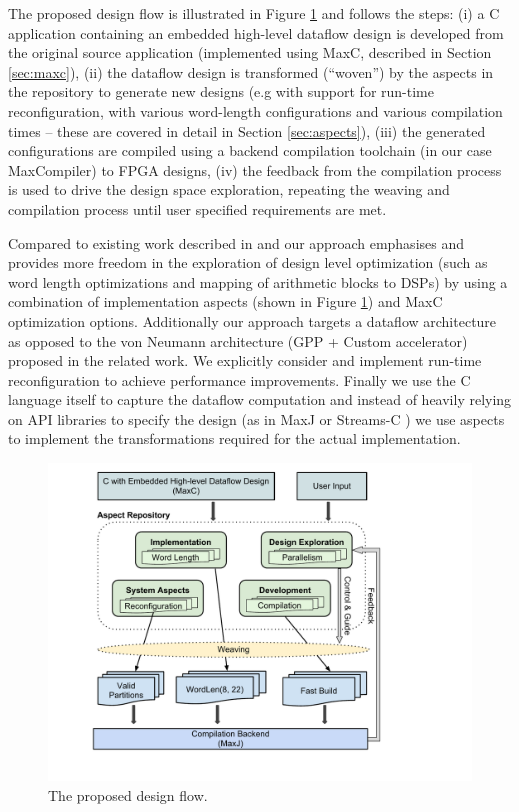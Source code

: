 The proposed design flow is illustrated in Figure
\ref{fig:design-flow} and follows the steps: (i) a C application
containing an embedded high-level dataflow design is developed from
the original source application (implemented using MaxC, described in
Section \ref{sec:maxc}), (ii) the dataflow design is transformed
(``woven'') by the aspects in the repository to generate new designs
(e.g with support for run-time reconfiguration, with various
word-length configurations and various compilation times -- these are
covered in detail in Section \ref{sec:aspects}), (iii) the generated
configurations are compiled using a backend compilation toolchain (in
our case MaxCompiler) to FPGA designs, (iv) the feedback from the
compilation process is used to drive the design space exploration,
repeating the weaving and compilation process until user specified
requirements are met.

Compared to existing work described in
\cite{Cardoso:Teixeira:Alves:Nobre:Diniz:Cutinho:Luk:2012} and
\cite{cardoso2011new} our approach emphasises and provides more
freedom in the exploration of design level optimization (such as word
length optimizations and mapping of arithmetic blocks to DSPs) by
using a combination of implementation aspects (shown in Figure
\ref{fig:design-flow}) and MaxC optimization options.  Additionally
our approach targets a dataflow architecture as opposed to the von
Neumann architecture (GPP + Custom accelerator) proposed in the
related work. We explicitly consider and implement run-time
reconfiguration to achieve performance improvements. Finally we use
the C language itself to capture the dataflow computation and instead
of heavily relying on API libraries to specify the design (as in MaxJ
\cite{MaxelerTechnologies:2012} or Streams-C
\cite{Gokhale:Stone:Arnold:Kalinowski:2000}) we use aspects to
implement the transformations required for the actual implementation.

\begin{figure}[!h]
  \includegraphics[scale=0.51, trim=72 50 0 0]{figs/design-flow}
  \caption{The proposed design flow.}
  \label{fig:design-flow}
\end{figure}
